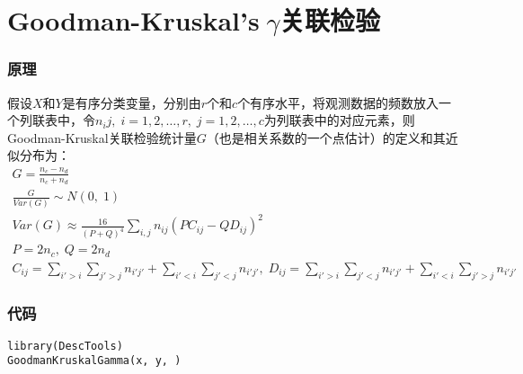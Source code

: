 \section{Goodman-Kruskal's$\;\gamma$关联检验}

\subsubsection{原理}
假设$X$和$Y$是有序分类变量，分别由$r$个和$c$个有序水平，将观测数据的频数放入一个列联表中，令$n_ij,\;i=1,2,\dots,r,\;j=1,2,\dots,c$为列联表中的对应元素，则Goodman-Kruskal关联检验统计量$G$（也是相关系数的一个点估计）的定义和其近似分布为：
\begin{gather*}
	G=\frac{n_c-n_d}{n_c+n_d} \\
	\frac{G}{Var(G)}\sim N(0,\;1) \\
	Var(G)\approx\frac{16}{(P+Q)^4}\sum_{i,j}n_{ij}(PC_{ij}-QD_{ij})^2 \\
	P=2n_c,\;Q=2n_d \\
	C_{ij}=\sum_{i'>i}\sum_{j'>j}n_{i'j'}+\sum_{i'<i}\sum_{j'<j}n_{i'j'},\;D_{ij}=\sum_{i'>i}\sum_{j'<j}n_{i'j'}+\sum_{i'<i}\sum_{j'>j}n_{i'j'}
\end{gather*}

\subsubsection{代码}
\begin{verbatim}
library(DescTools)
GoodmanKruskalGamma(x, y, )
\end{verbatim}
